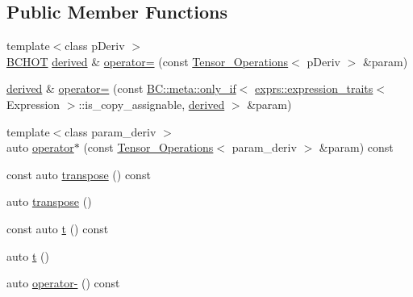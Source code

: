 \subsection*{Public Member Functions}
\begin{DoxyCompactItemize}
\item 
{\footnotesize template$<$class p\+Deriv $>$ }\\\hyperlink{BlackCat__Common_8h_ac085f07cc309e3aac24aa3fc0a40f6d2}{B\+C\+H\+OT} \hyperlink{structBC_1_1tensors_1_1Tensor__Operations_a830b9a11262226b18af9caef7b9da13b}{derived} \& \hyperlink{structBC_1_1tensors_1_1Tensor__Operations_a846f62c3e0a0e813c344a3a62f2e4e86}{operator=} (const \hyperlink{structBC_1_1tensors_1_1Tensor__Operations}{Tensor\+\_\+\+Operations}$<$ p\+Deriv $>$ \&param)
\item 
\hyperlink{structBC_1_1tensors_1_1Tensor__Operations_a830b9a11262226b18af9caef7b9da13b}{derived} \& \hyperlink{structBC_1_1tensors_1_1Tensor__Operations_a6d29ad7700f905abb54691a9f1e1735f}{operator=} (const \hyperlink{namespaceBC_1_1meta_afed7f4daa1d160f98e989138722fd031}{B\+C\+::meta\+::only\+\_\+if}$<$ \hyperlink{structBC_1_1tensors_1_1exprs_1_1expression__traits}{exprs\+::expression\+\_\+traits}$<$ Expression $>$\+::is\+\_\+copy\+\_\+assignable, \hyperlink{structBC_1_1tensors_1_1Tensor__Operations_a830b9a11262226b18af9caef7b9da13b}{derived} $>$ \&param)
\item 
{\footnotesize template$<$class param\+\_\+deriv $>$ }\\auto \hyperlink{structBC_1_1tensors_1_1Tensor__Operations_a35e6557f78bb866b756bf52709b190df}{operator$\ast$} (const \hyperlink{structBC_1_1tensors_1_1Tensor__Operations}{Tensor\+\_\+\+Operations}$<$ param\+\_\+deriv $>$ \&param) const 
\item 
const auto \hyperlink{structBC_1_1tensors_1_1Tensor__Operations_a5f339c4fec8d159973d05d12cd29a135}{transpose} () const 
\item 
auto \hyperlink{structBC_1_1tensors_1_1Tensor__Operations_ac408bdabd760f9464ed66d9efcf43be0}{transpose} ()
\item 
const auto \hyperlink{structBC_1_1tensors_1_1Tensor__Operations_a6d5a8ff7ab127322609943af5a2d1064}{t} () const 
\item 
auto \hyperlink{structBC_1_1tensors_1_1Tensor__Operations_aace003bdad68df77f429a239d3b2784d}{t} ()
\item 
auto \hyperlink{structBC_1_1tensors_1_1Tensor__Operations_a3bacb2241b1bab40d9212734eb0e41fc}{operator-\/} () const 
\item 

\end{DoxyCompactItemize}
